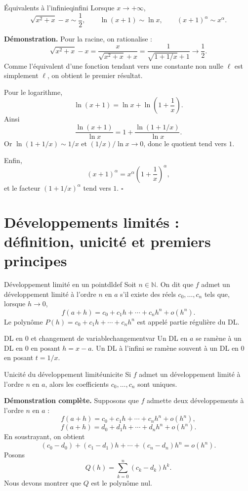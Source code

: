 \documentclass[11pt,a4paper]{article}
\newcommand{\N}{\mathbb{N}}
\begin{document}
\begin{propositionbox}{Équivalents à l'infini}{eqinfini}
Lorsque $x\to+\infty$,
\[
\sqrt{x^2+x}-x\sim\frac12,
\qquad
\ln(x+1)\sim\ln x,
\qquad
(x+1)^\alpha\sim x^\alpha.
\]
\end{propositionbox}

\textbf{Démonstration.} Pour la racine, on rationalise :
\[
  \sqrt{x^2+x}-x=\frac{x}{\sqrt{x^2+x}+x}=\frac{1}{\sqrt{1+1/x}+1}\to\frac12.
\]
Comme l'équivalent d'une fonction tendant vers une constante non nulle $\ell$ est simplement $\ell$, on obtient le premier résultat.

Pour le logarithme,
\[
  \ln(x+1)=\ln x+\ln\left(1+\frac1x\right).
\]
Ainsi
\[
  \frac{\ln(x+1)}{\ln x}=1+\frac{\ln(1+1/x)}{\ln x}.
\]
Or $\ln(1+1/x)\sim1/x$ et $(1/x)/\ln x\to0$, donc le quotient tend vers $1$.

Enfin,
\[
  (x+1)^\alpha=x^\alpha\left(1+\frac1x\right)^\alpha,
\]
et le facteur $(1+1/x)^\alpha$ tend vers $1$.
\hfill $\square$

\section{Développements limités : définition, unicité et premiers principes}

\begin{definitionbox}{Développement limité en un point}{dldef}
Soit $n\in\N$. On dit que $f$ admet un développement limité à l'ordre $n$ en $a$ s'il existe des réels $c_0,\ldots,c_n$ tels que, lorsque $h\to0$,
\[
  f(a+h)=c_0+c_1h+\cdots+c_nh^n+o(h^n).
\]
Le polynôme $P(h)=c_0+c_1h+\cdots+c_nh^n$ est appelé partie régulière du DL.
\end{definitionbox}

\begin{remarkbox}{DL en $0$ et changement de variable}{changementvar}
Un DL en $a$ se ramène à un DL en $0$ en posant $h=x-a$. Un DL à l'infini se ramène souvent à un DL en $0$ en posant $t=1/x$.
\end{remarkbox}

\begin{theorembox}{Unicité du développement limité}{unicite}
Si $f$ admet un développement limité à l'ordre $n$ en $a$, alors les coefficients $c_0,\ldots,c_n$ sont uniques.
\end{theorembox}

\textbf{Démonstration complète.} Supposons que $f$ admette deux développements à l'ordre $n$ en $a$ :
\[
  f(a+h)=c_0+c_1h+\cdots+c_nh^n+o(h^n),
\]
\[
  f(a+h)=d_0+d_1h+\cdots+d_nh^n+o(h^n).
\]
En soustrayant, on obtient
\[
  (c_0-d_0)+(c_1-d_1)h+\cdots+(c_n-d_n)h^n=o(h^n).
\]
Posons
\[
  Q(h)=\sum_{k=0}^n (c_k-d_k)h^k.
\]
Nous devons montrer que $Q$ est le polynôme nul.
\end{document}
